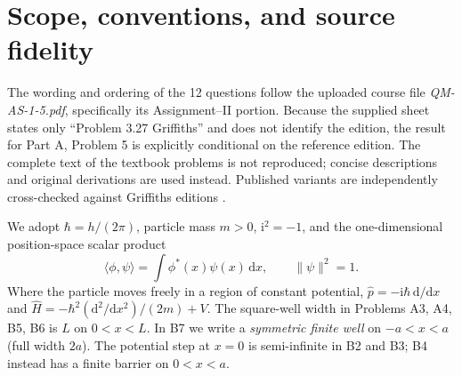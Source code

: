 \documentclass[11pt,a4paper]{article}
\newcommand{\dd}{\mathrm{d}}
\newcommand{\iu}{\mathrm{i}}
\newcommand{\Sch}{Schr\"odinger}
\begin{document}
\begin{abstract}
This pedagogical manuscript supplies step-by-step solutions to the five short-answer and seven long-answer questions of Quantum Mechanics--I Assignment II. Part A develops a direct verification of Cauchy--Schwarz for Legendre polynomials, commutator tests for compatible observables, exact position probabilities in an infinite well, and the energy statistics of an equal superposition. Its final reference, ``Griffiths Problem 3.27,'' omits an edition; we treat the verified second-edition sequential-measurement problem as a fully worked reference case and present separately verified first- and third-edition alternatives in an appendix. Part B proves the full \Sch--Robertson inequality and derives scattering amplitudes and flux coefficients for both above-threshold and below-threshold potential steps, the exact rectangular-barrier tunneling coefficient, the infinite-well spectrum, its position--momentum uncertainties, and the bound states of a finite symmetric well. The numerical finite-well example is computed at the dimensionless strength $P=4$, with explicitly normalized eigenfunctions and original plots of the first three probability densities. Operator-domain qualifications and normalization conventions are stated where they materially affect the mathematics. This is a study preprint, not evidence of new physical research or journal review.
\end{abstract}
\begingroup
\small
\setlength{\parskip}{0pt}
\tableofcontents
\endgroup
\clearpage
\section{Scope, conventions, and source fidelity}
The wording and ordering of the 12 questions follow the uploaded course file \emph{QM-AS-1-5.pdf}, specifically its Assignment--II portion. Because the supplied sheet states only ``Problem 3.27 Griffiths'' and does not identify the edition, the result for Part A, Problem 5 is explicitly conditional on the reference edition. The complete text of the textbook problems is not reproduced; concise descriptions and original derivations are used instead. Published variants are independently cross-checked against Griffiths editions \cite{griffiths1,griffiths2,griffiths3}.

We adopt $\hbar=h/(2\pi)$, particle mass $m>0$, $\iu^2=-1$, and the one-dimensional position-space scalar product
\begin{equation}
\langle\phi,\psi\rangle=\int \phi^*(x)\psi(x)\,\dd x,\qquad \|\psi\|^2=1.
\end{equation}
Where the particle moves freely in a region of constant potential, $\hat p=-\iu\hbar\,\dd/\dd x$ and $\hat H=-\hbar^2(\dd^2/\dd x^2)/(2m)+V$. The square-well width in Problems A3, A4, B5, B6 is $L$ on $0<x<L$. In B7 we write a \emph{symmetric finite well} on $-a<x<a$ (full width $2a$). The potential step at $x=0$ is semi-infinite in B2 and B3; B4 instead has a finite barrier on $0<x<a$.
\end{document}
